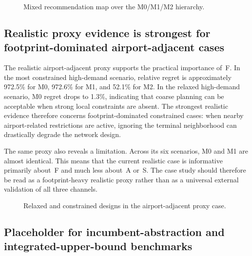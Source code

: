 \documentclass[review,authoryear]{elsarticle}
\begin{document}
\begin{figure}[htbp]
  \centering
  \caption{Mixed recommendation map over the M0/M1/M2 hierarchy.}
  \label{fig:recommendation}
\end{figure}

\subsection{Realistic proxy evidence is strongest for footprint-dominated airport-adjacent cases}
\label{sec:results:proxy}

The realistic airport-adjacent proxy supports the practical importance of~F. In the most constrained high-demand scenario, relative regret is approximately 972.5\% for M0, 972.6\% for M1, and 52.1\% for M2. In the relaxed high-demand scenario, M0 regret drops to 1.3\%, indicating that coarse planning can be acceptable when strong local constraints are absent. The strongest realistic evidence therefore concerns footprint-dominated constrained cases: when nearby airport-related restrictions are active, ignoring the terminal neighborhood can drastically degrade the network design.

The same proxy also reveals a limitation. Across its six scenarios, M0 and M1 are almost identical. This means that the current realistic case is informative primarily about~F and much less about~A or~S. The case study should therefore be read as a footprint-heavy realistic proxy rather than as a universal external validation of all three channels.

\begin{figure}[htbp]
  \centering
  \caption{Relaxed and constrained designs in the airport-adjacent proxy case.}
  \label{fig:proxy_results}
\end{figure}

\subsection{Placeholder for incumbent-abstraction and integrated-upper-bound benchmarks}
\label{sec:results:benchmark}
\end{document}
